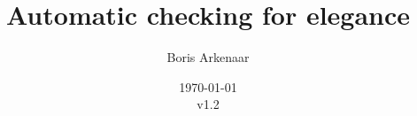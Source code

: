 \documentclass{article}
\begin{document}
 

\title{Automatic checking for elegance}
\author{Boris Arkenaar}
\date{\today\\v1.2}
\maketitle 





\printglossaries
\end{document}
